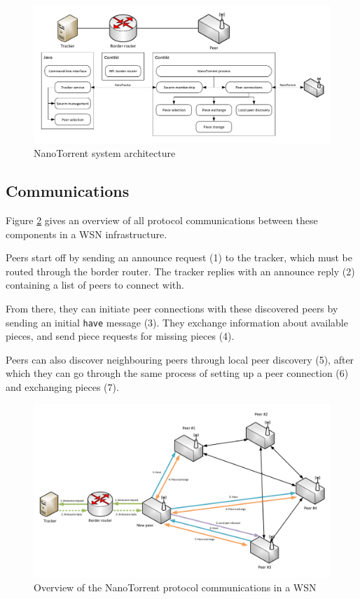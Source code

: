 \begin{figure}
    \centering
    \includegraphics[width=\textwidth]{diagrams/protocol-architecture.pdf}
    \caption{NanoTorrent system architecture}
    \label{fig:impl:architecture}
\end{figure}

\subsection{Communications}
Figure \ref{fig:impl:protocol-overview} gives an overview of all protocol communications between these components in a \gls{WSN} infrastructure.

Peers start off by sending an announce request (1) to the tracker, which must be routed through the border router. The tracker replies with an announce reply (2) containing a list of peers to connect with.

From there, they can initiate peer connections with these discovered peers by sending an initial \texttt{have} message (3). They exchange information about available pieces, and send piece requests for missing pieces (4).

Peers can also discover neighbouring peers through local peer discovery (5), after which they can go through the same process of setting up a peer connection (6) and exchanging pieces (7).

\begin{figure}
    \centering
    \includegraphics[width=\textwidth]{diagrams/protocol-overview.pdf}
    \caption{Overview of the NanoTorrent protocol communications in a \gls{WSN}}
    \label{fig:impl:protocol-overview}
\end{figure}

